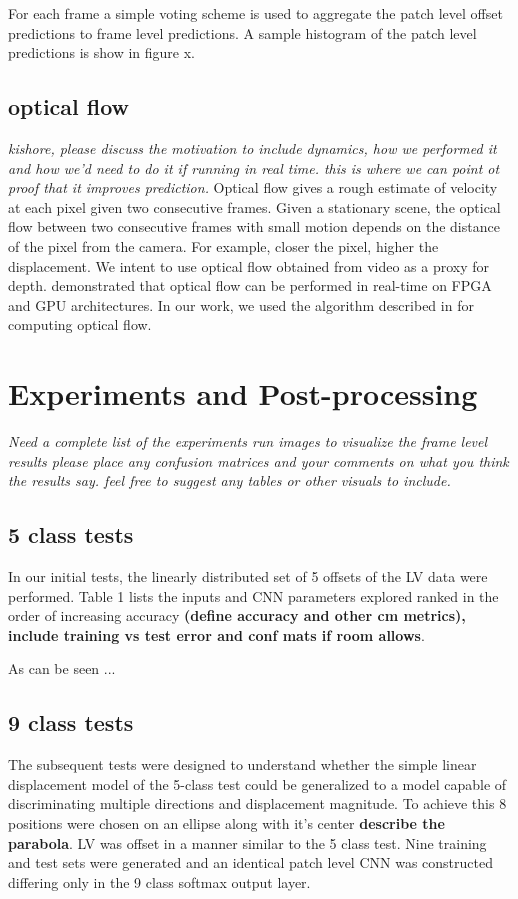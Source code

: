 \documentclass{article}
\begin{document}
For each frame a simple voting scheme is used to aggregate the patch level offset predictions to frame level predictions. A sample histogram of the patch level predictions is show in figure x.

\subsection{optical flow} \textit{kishore, please discuss the motivation to include dynamics, how we performed it and how we'd need to do it if running in real time. this is where we can point ot proof that it improves prediction.}
Optical flow gives a rough estimate of velocity at each pixel given two consecutive frames. Given a stationary scene, the optical flow between two consecutive frames with small motion depends on the distance of the pixel from the camera. For example, closer the pixel, higher the displacement. We intent to use optical flow obtained from video as a proxy for depth. \cite{Opticalflow_realtime} demonstrated that optical flow can be performed in real-time on FPGA and GPU architectures. In our work, we used the algorithm described in \cite{LiuOpticalFlow} for computing optical flow.

\section{Experiments and Post-processing} %
\label{sec:experiments_and_post_processing}
\textit{Need a complete list of the experiments run
images to visualize the frame level results
please place any confusion matrices and your comments on what you think the results say.
feel free to suggest any tables or other visuals to include.}

\subsection{5 class tests}
In our initial tests, the linearly distributed set of 5 offsets of the LV data were performed. Table 1 lists the inputs and CNN parameters explored ranked in the order of increasing accuracy \textbf{(define accuracy and other cm metrics), include training vs test error and conf mats if room allows}.  

As can be seen ... 

\subsection{9 class tests}
The subsequent tests were designed to understand whether the simple linear displacement model of the 5-class test could be generalized to a model capable of discriminating multiple directions and displacement magnitude. To achieve this 8 positions were chosen on an ellipse along with it's center \textbf{describe the parabola}. LV was offset in a manner similar to the 5 class test. Nine training and test sets were generated and an identical patch level CNN was constructed differing only in the 9 class softmax output layer. 
\end{document}
